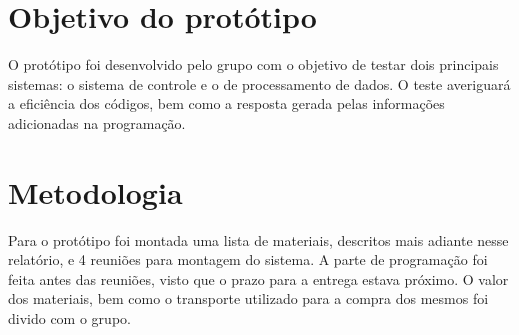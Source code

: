 \documentclass[]{report}
\begin{document}
\section{Objetivo do protótipo}
O protótipo foi desenvolvido pelo grupo com o objetivo de testar dois principais sistemas: o sistema de controle e o de processamento de dados. O teste averiguará a eficiência dos códigos, bem como a resposta gerada pelas informações adicionadas na programação.
\section{Metodologia}
Para o protótipo foi montada uma lista de materiais, descritos mais adiante nesse relatório, e 4 reuniões para montagem do sistema. A parte de programação foi feita antes das reuniões, visto que o prazo para a entrega estava próximo. O valor dos materiais, bem como o transporte utilizado para a compra dos mesmos foi divido com o grupo.
\end{document}
